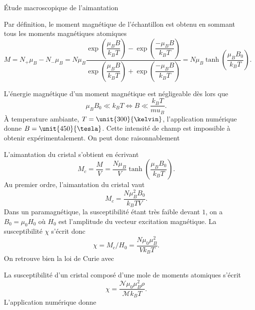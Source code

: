 \begin{corr}{Étude macroscopique de l'aimantation}
\begin{corrlist}
    Par définition, le moment magnétique de l'échantillon est obtenu en sommant
    tous les moments magnétiques atomiques
    \begin{equation*}
	    M = N_+ \mu_B - N_- \mu_B = N \mu_B
		    \dfrac{\exp\left(\dfrac{\mu_B B}{k_B T}\right) - 
		    \exp\left(\dfrac{-\mu_B B}{k_B T}\right)}
		    {\exp\left(\dfrac{\mu_B B}{k_B T}\right) + 
		    \exp\left(\dfrac{-\mu_B B}{k_B T}\right)}
	      = \boxed{N \mu_B \tanh\left(\dfrac{\mu_B B_0}{k_B T}\right).}
    \end{equation*}

    \item L'énergie magnétique d'un moment magnétique est négligeable dès lors que 
      \begin{equation*}
	      \mu_B B_0 \ll k_B T \iff \boxed{B \ll \dfrac{k_B T}{mu_B}.}
      \end{equation*}
      À temperature ambiante, $T = \unit{300}{\kelvin}$, l'application numérique
      donne $B = \unit{450}{\tesla}$. Cette intensité de champ est impossible à obtenir
      expérimentalement. On peut donc raisonnablement 
      \item L'aimantation du cristal s'obtient en écrivant
      \begin{equation*}
	      M_c = \dfrac{M}{V} = \dfrac{N \mu_B}{V} 
	      \tanh\left(\dfrac{\mu_B B_0}{k_B T}\right).
      \end{equation*}
      Au premier ordre, l'aimantation du cristal vaut
      \begin{equation*}
	      \boxed{M_c = \dfrac{N \mu_B^2 B_0}{k_B T V}.}
      \end{equation*}
      Dans un paramagnétique, la susceptibilité étant très faible devant $1$, 
      on a $B_0 = \mu_0 H_0$ où $H_0$ est l'amplitude du vecteur excitation magnétique.
      La susceptibilité $\chi$ s'écrit donc
      \begin{equation*}
	      \boxed{\chi = M_c/H_0 = \dfrac{N \mu_0 \mu_B^2}{V k_B T}.}
      \end{equation*}
       On retrouve bien la loi de Curie avec 

      \item La susceptibilité 
      d'un cristal composé d'une mole de moments atomiques s'écrit
      \begin{equation*}
	      \chi = \dfrac{\mathcal{N} \mu_0 \mu_B^2 \rho}{\mathcal{M} k_B T}.
      \end{equation*}
      L'application numérique donne 
\end{corrlist}
\end{corr}
